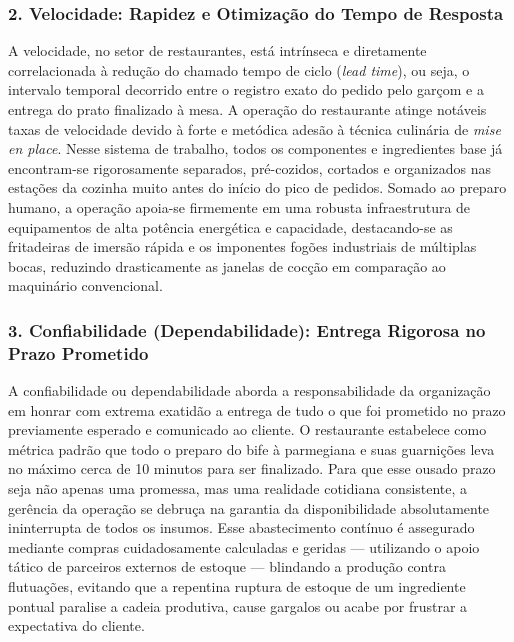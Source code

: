 \documentclass[12pt, a4paper]{article}
\begin{document}
\subsubsection*{2. Velocidade: Rapidez e Otimização do Tempo de Resposta}
A velocidade, no setor de restaurantes, está intrínseca e diretamente correlacionada à redução do chamado tempo de ciclo (\textit{lead time}), ou seja, o intervalo temporal decorrido entre o registro exato do pedido pelo garçom e a entrega do prato finalizado à mesa. A operação do restaurante atinge notáveis taxas de velocidade devido à forte e metódica adesão à técnica culinária de \textit{mise en place}. Nesse sistema de trabalho, todos os componentes e ingredientes base já encontram-se rigorosamente separados, pré-cozidos, cortados e organizados nas estações da cozinha muito antes do início do pico de pedidos. Somado ao preparo humano, a operação apoia-se firmemente em uma robusta infraestrutura de equipamentos de alta potência energética e capacidade, destacando-se as fritadeiras de imersão rápida e os imponentes fogões industriais de múltiplas bocas, reduzindo drasticamente as janelas de cocção em comparação ao maquinário convencional.

\subsubsection*{3. Confiabilidade (Dependabilidade): Entrega Rigorosa no Prazo Prometido}
A confiabilidade ou dependabilidade aborda a responsabilidade da organização em honrar com extrema exatidão a entrega de tudo o que foi prometido no prazo previamente esperado e comunicado ao cliente. O restaurante estabelece como métrica padrão que todo o preparo do bife à parmegiana e suas guarnições leva no máximo cerca de 10 minutos para ser finalizado. Para que esse ousado prazo seja não apenas uma promessa, mas uma realidade cotidiana consistente, a gerência da operação se debruça na garantia da disponibilidade absolutamente ininterrupta de todos os insumos. Esse abastecimento contínuo é assegurado mediante compras cuidadosamente calculadas e geridas --- utilizando o apoio tático de parceiros externos de estoque --- blindando a produção contra flutuações, evitando que a repentina ruptura de estoque de um ingrediente pontual paralise a cadeia produtiva, cause gargalos ou acabe por frustrar a expectativa do cliente.
\end{document}
